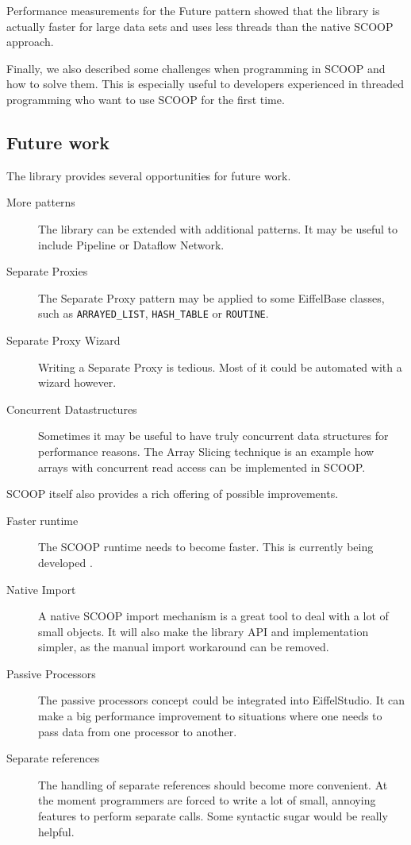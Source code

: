 \documentclass[a4paper,10pt,titlepage]{article}
\begin{document}
Performance measurements for the Future pattern showed that the library is actually faster for large data sets and uses less threads than the native SCOOP approach.

Finally, we also described some challenges when programming in SCOOP and how to solve them.
This is especially useful to developers experienced in threaded programming who want to use SCOOP for the first time.

\subsection{Future work}

The library provides several opportunities for future work.

\begin{description}
 \item [More patterns] The library can be extended with additional patterns.
 It may be useful to include Pipeline or Dataflow Network.
 \item [Separate Proxies] The Separate Proxy pattern may be applied to some EiffelBase classes, such as \lstinline!ARRAYED_LIST!, \lstinline!HASH_TABLE! or \lstinline!ROUTINE!.
 \item [Separate Proxy Wizard] Writing a Separate Proxy is tedious. Most of it could be automated with a wizard however.
 \item [Concurrent Datastructures] Sometimes it may be useful to have truly concurrent data structures for performance reasons.
The Array Slicing technique \cite{paper:array-slicing} is an example how arrays with concurrent read access can be implemented in SCOOP.
\end{description}

SCOOP itself also provides a rich offering of possible improvements.

\begin{description}
 \item [Faster runtime] The SCOOP runtime needs to become faster. 
 This is currently being developed \cite{thesis:scottwest}.
 \item [Native Import] A native SCOOP import mechanism is a great tool to deal with a lot of small objects.
 It will also make the library API and implementation simpler, as the manual import workaround can be removed.
 \item [Passive Processors] The passive processors concept \cite{paper:passive-processors} could be integrated into EiffelStudio.
 It can make a big performance improvement to situations where one needs to pass data from one processor to another.
 \item [Separate references] The handling of separate references should become more convenient.
 At the moment programmers are forced to write a lot of small, annoying features to perform separate calls.
 Some syntactic sugar would be really helpful.
\end{description}
\end{document}
